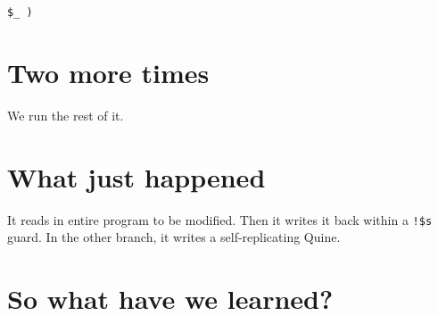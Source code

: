 \documentclass{article}
\begin{document}
\begin{verbatim}
$_ )
\end{verbatim}

\section{Two more times}
We run the rest of it.

\section{What just happened}
It reads in entire program to be modified.  Then it writes it back within 
a \verb"!$s" guard. In the other branch, it writes a self-replicating Quine. 

\section{So what have we learned?}
\end{document}
